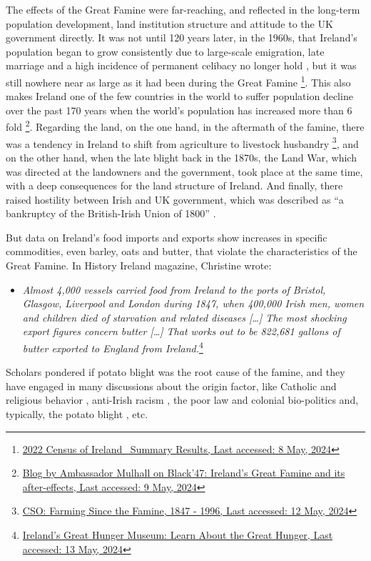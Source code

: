 The effects of the Great Famine were far-reaching, and reflected in the long-term population development, land institution structure and attitude to the UK government directly. It was not until 120 years later, in the 1960s, that Ireland's population began to grow consistently due to large-scale emigration, late marriage and a high incidence of permanent celibacy no longer hold \citep{grada1979population}, but it was still nowhere near as large as it had been during the Great Famine
\footnote{
	\href{https://www.cso.ie/en/releasesandpublications/ep/p-cpsr/censusofpopulation2022-summaryresults/populationchanges/}
	{2022 Census of Ireland \textendash\ Summary Results, Last accessed: 8 May, 2024}
}.
This also makes Ireland one of the few countries in the world to suffer population decline over the past 170 years when the world's population has increased more than 6 fold
\footnote{
	\href{https://www.dfa.ie/irish-embassy/usa/about-us/ambassador/ambassadors-blog/black47irelandsgreatfamineanditsafter-effects/}
	{Blog by Ambassador Mulhall on Black'47: Ireland's Great Famine and its after-effects, Last accessed: 9 May, 2024}
}. Regarding the land, on the one hand, in the aftermath of the famine, there was a tendency in Ireland to shift from agriculture to livestock husbandry
\footnote{
	\href{https://www.cso.ie/en/statistics/othercsopublications/farmingsincethefamine1847-1996/}{CSO: Farming Since the Famine, 1847 - 1996, Last accessed: 12 May, 2024}
}, and on the other hand, when the late blight back in the 1870s, the Land War, which was directed at the landowners and the government, took place at the same time, with a deep consequences for the land structure of Ireland. And finally, there raised hostility between Irish and UK government, which was described as ``a bankruptcy of the British-Irish Union of 1800'' \citep{gray2021great}.

But data on Ireland's food imports and exports show increases in specific commodities, even barley, oats and butter, that violate the characteristics of the Great Famine. In History Ireland magazine, Christine wrote:
\begin{itemize}
	\item[] \textit{Almost 4,000 vessels carried food from Ireland to the ports of Bristol, Glasgow, Liverpool and London during 1847, when 400,000 Irish men, women and children died of starvation and related diseases [\ldots] The most shocking export figures concern butter [\ldots] That works out to be 822,681 gallons of butter exported to England from Ireland.}\footnote{
	\href{https://www.ighm.org/learn.html}{Ireland's Great Hunger Museum: Learn About the Great Hunger, Last accessed: 13 May, 2024}}
\end{itemize}
Scholars pondered if potato blight was the root cause of the famine, and they have engaged in many discussions about the origin factor, like Catholic and religious behavior \citep{miller1975irish}, anti-Irish racism \citep{waters1995great}, the poor law and colonial bio-politics \citep{nally2008coming} and, typically, the potato blight \citep{bartoletti2001black}, etc.


